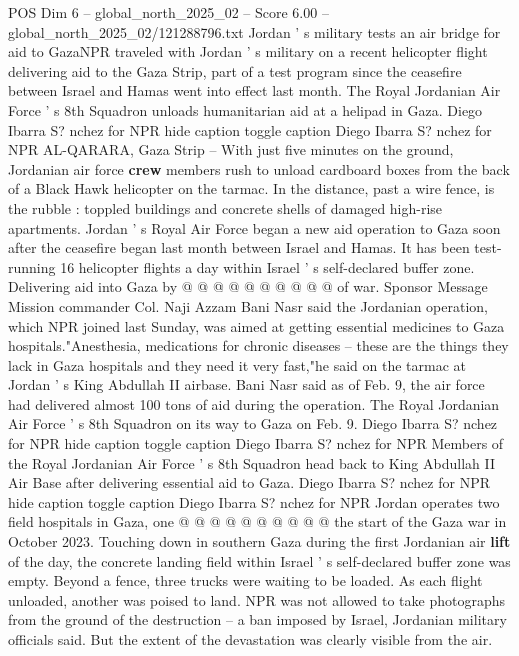 \begin{textsample}{POS Dim 6 – global\_north\_2025\_02 – Score 6.00 – global\_north\_2025\_02/121288796.txt}  \label{ex:f6_pos_341}
Jordan ' s military tests an air bridge for aid to GazaNPR traveled with Jordan ' s military on a recent helicopter flight delivering aid to the Gaza Strip, part of a test program since the ceasefire between Israel and Hamas went into effect last month.
The Royal Jordanian Air Force ' s 8th Squadron unloads humanitarian aid at a helipad in Gaza.
Diego Ibarra S? nchez for NPR hide caption toggle caption Diego Ibarra S? nchez for NPR AL-QARARA, Gaza Strip -- With just five minutes on the ground, Jordanian air force \textbf{crew} members rush to unload cardboard boxes from the back of a Black Hawk helicopter on the tarmac.
In the distance, past a wire fence, is the rubble : toppled buildings and concrete shells of damaged high-rise apartments.
Jordan ' s Royal Air Force began a new aid operation to Gaza soon after the ceasefire began last month between Israel and Hamas.
It has been test-running 16 helicopter flights a day within Israel ' s self-declared buffer zone.
Delivering aid into Gaza by @ @ @ @ @ @ @ @ @ @ of war.
Sponsor Message Mission commander Col.
Naji Azzam Bani Nasr said the Jordanian operation, which NPR joined last Sunday, was aimed at getting essential medicines to Gaza hospitals."Anesthesia, medications for chronic diseases -- these are the things they lack in Gaza hospitals and they need it very fast,"he said on the tarmac at Jordan ' s King Abdullah II airbase.
Bani Nasr said as of Feb. 9, the air force had delivered almost 100 tons of aid during the operation.
The Royal Jordanian Air Force ' s 8th Squadron on its way to Gaza on Feb. 9.
Diego Ibarra S? nchez for NPR hide caption toggle caption Diego Ibarra S? nchez for NPR Members of the Royal Jordanian Air Force ' s 8th Squadron head back to King Abdullah II Air Base after delivering essential aid to Gaza.
Diego Ibarra S? nchez for NPR hide caption toggle caption Diego Ibarra S? nchez for NPR Jordan operates two field hospitals in Gaza, one @ @ @ @ @ @ @ @ @ @ the start of the Gaza war in October 2023.
Touching down in southern Gaza during the first Jordanian air \textbf{lift} of the day, the concrete landing field within Israel ' s self-declared buffer zone was empty.
Beyond a fence, three trucks were waiting to be loaded.
As each flight unloaded, another was poised to land.
NPR was not allowed to take photographs from the ground of the destruction -- a ban imposed by Israel, Jordanian military officials said.
But the extent of the devastation was clearly visible from the air.

\end{textsample}

